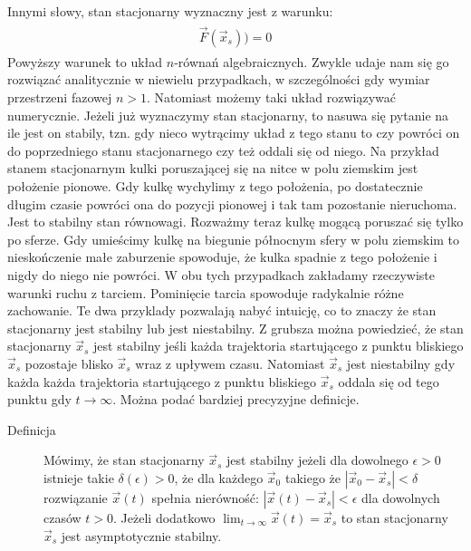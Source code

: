 \documentclass[a4paper,12pt,polish]{sphinxmanual}
\begin{document}
Innymi słowy, stan stacjonarny wyznaczny jest z warunku:
\label{ch1/chI023:equation-eqn4}\begin{gather}
\begin{split}\vec F(\vec x_s)) = 0\end{split}\label{ch1/chI023-eqn4}
\end{gather}
Powyższy warunek to układ $n$-równań algebraicznych. Zwykle udaje  nam się go rozwiązać analitycznie w niewielu przypadkach,  w szczególności gdy wymiar przestrzeni fazowej  $n >1$.  Natomiast możemy taki układ rozwiązywać numerycznie. Jeżeli już wyznaczymy stan stacjonarny, to nasuwa się pytanie na ile jest on stabily, tzn. gdy nieco wytrącimy układ z tego stanu to czy powróci on do poprzedniego stanu stacjonarnego czy też oddali się od niego.  Na przykład stanem stacjonarnym kulki poruszającej się na nitce w polu ziemskim jest położenie pionowe. Gdy kulkę wychylimy z tego położenia, po dostatecznie długim czasie powróci ona do pozycji pionowej i tak tam pozostanie nieruchoma. Jest to stabilny stan równowagi. Rozważmy teraz kulkę mogącą poruszać się tylko po sferze. Gdy umieścimy kulkę na  biegunie północnym sfery w polu ziemskim to nieskończenie małe zaburzenie spowoduje, że kulka spadnie z tego położenie i nigdy do niego nie powróci. W obu tych przypadkach zakładamy  rzeczywiste warunki ruchu z tarciem. Pominięcie tarcia spowoduje radykalnie różne zachowanie. Te dwa przyklady pozwalają nabyć intuicję, co to znaczy że stan stacjonarny jest stabilny lub jest niestabilny.  Z grubsza można powiedzieć, że stan stacjonarny  $\vec x_s$ jest stabilny jeśli każda trajektoria startującego z punktu bliskiego $\vec x_s$ pozostaje blisko $\vec x_s$ wraz z upływem czasu. Natomiast  $\vec x_s$ jest niestabilny gdy  każda każda trajektoria startującego z punktu bliskiego $\vec x_s$ oddala się od tego punktu gdy $t\to \infty$.  Można podać bardziej precyzyjne definicje.
\begin{description}
\item[{Definicja}] \leavevmode
Mówimy, że stan stacjonarny  $\vec x_s$ jest stabilny jeżeli  dla dowolnego $\epsilon >0$ istnieje
takie $\delta(\epsilon) >0$, że dla każdego $\vec x_0$ takiego że $| \vec x_0 -\vec x_s| < \delta$
rozwiązanie $\vec x(t)$ spełnia nierówność: $|\vec x(t) - \vec x_s| < \epsilon$ dla dowolnych czasów $t>0$.
Jeżeli dodatkowo $\lim_{t\to \infty} \vec x(t)  = \vec x_s$ to stan stacjonarny $\vec x_s$ jest asymptotycznie stabilny.

\end{description}
\end{document}
